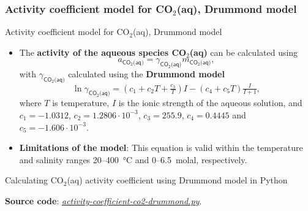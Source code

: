 \subsubsection{Activity coefficient model for CO$_2$(aq), Drummond model}
%
%
\begin{frame}{Activity coefficient model for CO$_{2}$(aq), Drummond model}
\begin{itemize}[<+->]
\item The \textbf{activity of the aqueous species CO$_{2}$(aq)} can be calculated
using
\[
a_{\mathsf{CO_{2}\text{(aq)}}}=\gamma_{\mathsf{CO_{2}\text{(aq)}}}m_{\mathsf{CO_{2}\text{(aq)}}},
\]
with $\gamma_{\mathsf{CO_{2}\text{(aq)}}}$ calculated using the \alert{\textbf{Drummond model}}
\[
\boxed{\ln\gamma_{\mathsf{CO_{2}\text{(aq)}}}=\left(c_{1}+c_{2}T+\tfrac{c_{3}}{T}\right)I-(c_{4}+c_{5}T)\tfrac{I}{I+1}},
\]
where $T$ is temperature,  
$I$ is the ionic strength of the aqueous solution, and 
${c_{1}=-1.0312}$, ${c_{2}=1.2806\cdot10^{-3}}$, ${c_{3}=255.9}$,
${c_{4}=0.4445}$ and ${c_{5}=-1.606\cdot10^{-3}}$. 
\item \textbf{Limitations of the model}: This equation is valid within the temperature and salinity ranges
20–400~°C and 0–6.5~molal, respectively.
\end{itemize}
\end{frame}
%
%
\begin{frame}{Calculating CO$_{2}$(aq) activity coefficient using Drummond model in Python}



\textbf{Source code}: \href{https://polybox.ethz.ch/index.php/s/Cg91f6PR1xIuKzY}{\textcolor{indigo(dye)}{\it  activity-coefficient-co2-drummond.py}}.

\end{frame}
